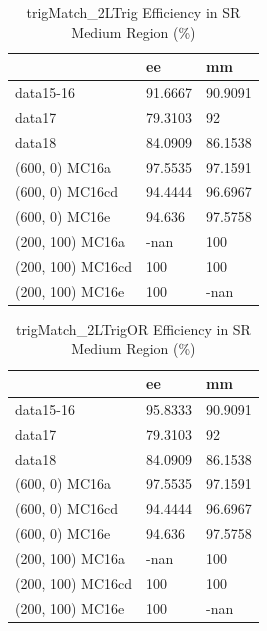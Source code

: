 \begin{table}
\begin{center}
\caption{trigMatch\_2LTrig Efficiency in SR Medium Region (\%)}
\begin{tabular}{l|l|l}
& ee & mm \\
\hline
data15-16 & 91.6667 & 90.9091 \\
data17 & 79.3103 & 92 \\
data18 & 84.0909 & 86.1538 \\
(600, 0) MC16a & 97.5535 & 97.1591 \\
(600, 0) MC16cd & 94.4444 & 96.6967 \\
(600, 0) MC16e & 94.636 & 97.5758 \\
(200, 100) MC16a & -nan & 100 \\
(200, 100) MC16cd & 100 & 100 \\
(200, 100) MC16e & 100 & -nan \\
\end{tabular}
\end{center}
\end{table}

\begin{table}
\begin{center}
\caption{trigMatch\_2LTrigOR Efficiency in SR Medium Region (\%)}
\begin{tabular}{l|l|l}
& ee & mm \\
\hline
data15-16 & 95.8333 & 90.9091 \\
data17 & 79.3103 & 92 \\
data18 & 84.0909 & 86.1538 \\
(600, 0) MC16a & 97.5535 & 97.1591 \\
(600, 0) MC16cd & 94.4444 & 96.6967 \\
(600, 0) MC16e & 94.636 & 97.5758 \\
(200, 100) MC16a & -nan & 100 \\
(200, 100) MC16cd & 100 & 100 \\
(200, 100) MC16e & 100 & -nan \\
\end{tabular}
\end{center}
\end{table}

